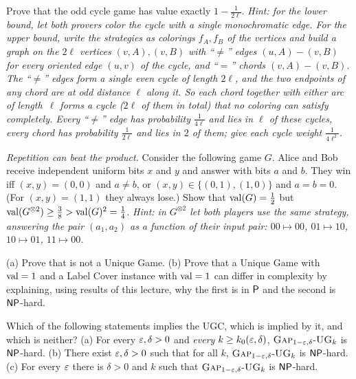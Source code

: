 \begin{exercise}[\stars{$\star\star$}]\label{ex:oddcycle}
Prove that the odd cycle game has value exactly $1-\tfrac1{2\ell}$.
\emph{Hint: for the lower bound, let both provers color the cycle with a single monochromatic edge.  For the
upper bound, write the strategies as colorings $f_A,f_B$ of the vertices and build a graph on the $2\ell$ vertices
$(v,A),(v,B)$ with ``$\ne$'' edges $(u,A)\!-\!(v,B)$ for every oriented edge $(u,v)$ of the cycle, and ``$=$'' chords
$(v,A)\!-\!(v,B)$.  The ``$\ne$'' edges form a single even cycle of length $2\ell$, and the two endpoints of any chord are
at odd distance $\ell$ along it.  So each chord together with either arc of length~$\ell$ forms a cycle ($2\ell$ of them
in total) that no coloring can satisfy completely.  Every ``$\ne$'' edge has probability $\tfrac1{4\ell}$ and lies in $\ell$
of these cycles, every chord has probability $\tfrac1{2\ell}$ and lies in $2$ of them; give each cycle weight
$\tfrac1{4\ell^2}$.}
\end{exercise}

\begin{exercise}[\stars{$\star\star$}]\label{ex:fortnow}
\emph{Repetition can beat the product.}  Consider the following game $G$.  Alice and Bob receive independent
uniform bits $x$ and $y$ and answer with bits $a$ and $b$.  They win iff $(x,y)=(0,0)$ and $a\ne b$, or
$(x,y)\in\{(0,1),(1,0)\}$ and $a=b=0$.  (For $(x,y)=(1,1)$ they always lose.)
Show that $\operatorname{val}(G)=\tfrac12$ but $\operatorname{val}(G^{\otimes2})\ge\tfrac38>\operatorname{val}(G)^2=\tfrac14$.
\emph{Hint: in $G^{\otimes 2}$ let both players use the same strategy, answering the pair $(a_1,a_2)$ as a function of
their input pair: $00\mapsto00$, $01\mapsto10$, $10\mapsto01$, $11\mapsto00$.}
\end{exercise}

\begin{exercise}[\stars{$\star$}]\label{ex:not-ug}
(a) Prove that  is not a Unique Game.  (b) Prove that a Unique Game with $\operatorname{val}=1$ and a
Label Cover instance with $\operatorname{val}=1$ can differ in complexity by explaining, using results of this lecture,
why the first is in $\mathsf{P}$ and the second is $\mathsf{NP}$-hard.
\end{exercise}

\begin{exercise}[\stars{$\star\star$}]\label{ex:quant}
Which of the following statements implies the UGC, which is implied by it, and which is neither?
(a) For every $\varepsilon,\delta>0$ and \emph{every} $k\ge k_0(\varepsilon,\delta)$, $\textsc{Gap}_{1-\varepsilon,\delta}\text{-}\textsc{UG}_k$ is $\mathsf{NP}$-hard.
(b) There exist $\varepsilon,\delta>0$ such that for all $k$, $\textsc{Gap}_{1-\varepsilon,\delta}\text{-}\textsc{UG}_k$ is $\mathsf{NP}$-hard.
(c) For every $\varepsilon$ there is $\delta>0$ and $k$ such that $\textsc{Gap}_{1-\varepsilon,\delta}\text{-}\textsc{UG}_k$ is $\mathsf{NP}$-hard.
\end{exercise}


